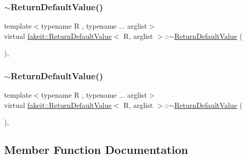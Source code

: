 \subsubsection{\texorpdfstring{$\sim$ReturnDefaultValue()}{~ReturnDefaultValue()}\hspace{0.1cm}{\footnotesize\ttfamily [8/9]}}
{\footnotesize\ttfamily template$<$typename R , typename ... arglist$>$ \\
virtual \mbox{\hyperlink{structfakeit_1_1ReturnDefaultValue}{fakeit\+::\+Return\+Default\+Value}}$<$ R, arglist $>$\+::$\sim$\mbox{\hyperlink{structfakeit_1_1ReturnDefaultValue}{Return\+Default\+Value}} (\begin{DoxyParamCaption}{ }\end{DoxyParamCaption})\hspace{0.3cm}{\ttfamily [virtual]}, {\ttfamily [default]}}

\mbox{\label{structfakeit_1_1ReturnDefaultValue_ae1985454992034296a118d73dbd21890}} 
\subsubsection{\texorpdfstring{$\sim$ReturnDefaultValue()}{~ReturnDefaultValue()}\hspace{0.1cm}{\footnotesize\ttfamily [9/9]}}
{\footnotesize\ttfamily template$<$typename R , typename ... arglist$>$ \\
virtual \mbox{\hyperlink{structfakeit_1_1ReturnDefaultValue}{fakeit\+::\+Return\+Default\+Value}}$<$ R, arglist $>$\+::$\sim$\mbox{\hyperlink{structfakeit_1_1ReturnDefaultValue}{Return\+Default\+Value}} (\begin{DoxyParamCaption}{ }\end{DoxyParamCaption})\hspace{0.3cm}{\ttfamily [virtual]}, {\ttfamily [default]}}



\subsection{Member Function Documentation}
\mbox{\label{structfakeit_1_1ReturnDefaultValue_a9b57c8c162e162b97415595f966e9c4a}} 
